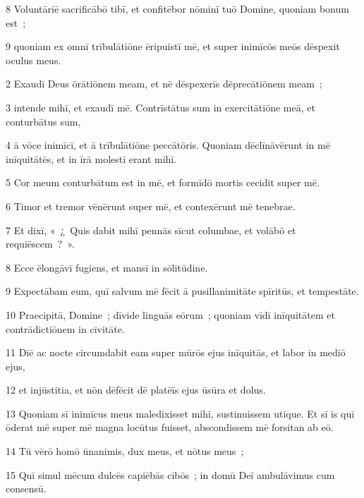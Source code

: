 \psalmVerse
  {\phantom{00}8}
  {Voluntāriē sacrificābō tibī, et confitēbor nōminī tuō Domine, quoniam bonum est~;}


\psalmVerse
  {\phantom{00}9}
  {quoniam ex omnī trībulātiōne ēripuistī mē, et super inimīcōs meōs dēspexit oculus meus.}



\psalmVerse
  {\phantom{00}2}
  {Exaudī Deus ōrātiōnem meam, et nē dēspexerīs dēprecātiōnem meam~;}


\psalmVerse
  {\phantom{00}3}
  {intende mihī, et exaudī mē. Contrīstātus sum in exercitātiōne meā, et conturbātus sum,}


\psalmVerse
  {\phantom{00}4}
  {ā vōce inimīcī, et ā trībulātiōne peccātōris. Quoniam dēclīnāvērunt in mē inīquitātēs, et in īrā molestī erant mihī.}


\psalmVerse
  {\phantom{00}5}
  {Cor meum conturbātum est in mē, et formīdō mortis cecidit super mē.}


\psalmVerse
  {\phantom{00}6}
  {Timor et tremor vēnērunt super mē, et contexērunt mē tenebrae.}


\psalmVerse
  {\phantom{00}7}
  {Et dixī, «~¿~Quis dabit mihī pennās sīcut columbae, et volābō et requiēscem~?~».}


\psalmVerse
  {\phantom{00}8}
  {Ecce ēlongāvī fugiens, et mansī in sōlitūdine.}


\psalmVerse
  {\phantom{00}9}
  {Expectābam eum, quī salvum mē fēcit ā pusillanimitāte spīritūs, et tempestāte.}


\psalmVerse
  {\phantom{0}10}
  {Praecipitā, Domine~; dīvide linguās eōrum~; quoniam vīdī inīquitātem et contrādictiōnem in cīvitāte.}


\psalmVerse
  {\phantom{0}11}
  {Diē ac nocte circumdabit eam super mūrōs ejus inīquitās, et labor in mediō ejus,}


\psalmVerse
  {\phantom{0}12}
  {et injūstitia, et nōn dēfēcit dē platēīs ejus ūsūra et dolus.}


\psalmVerse
  {\phantom{0}13}
  {Quoniam sī inimīcus meus maledixisset mihī, sustinuissem utique. Et sī is quī ōderat mē super mē magna locūtus fuisset, abscondissem mē forsitan ab eō.}


\psalmVerse
  {\phantom{0}14}
  {Tū vērō homō ūnanimis, dux meus, et nōtus meus~;}


\psalmVerse
  {\phantom{0}15}
  {Quī simul mēcum dulcēs capiēbās cibōs~; in domū Deī ambulāvimus cum consensū.}


